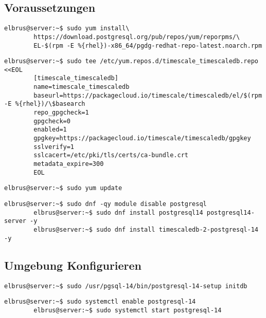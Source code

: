 \documentclass{article}
\begin{document}
	\subsection[dependencies]{Voraussetzungen}
	\lstset{style=commands}
	\begin{lstlisting}[caption={Hinzufügen des PostgreSQL Drittanbieter-Repository, um die neuesten PostgreSQL-Pakete zu erhalten.}]
		elbrus@server:~$ sudo yum install\
		https://download.postgresql.org/pub/repos/yum/reporpms/\
		EL-$(rpm -E %{rhel})-x86_64/pgdg-redhat-repo-latest.noarch.rpm
	\end{lstlisting}

	\lstset{style=commands}
	\begin{lstlisting}[caption={Erstellen des Timescale repository.}]
		elbrus@server:~$ sudo tee /etc/yum.repos.d/timescale_timescaledb.repo <<EOL
		[timescale_timescaledb]
		name=timescale_timescaledb
		baseurl=https://packagecloud.io/timescale/timescaledb/el/$(rpm -E %{rhel})/\$basearch
		repo_gpgcheck=1
		gpgcheck=0
		enabled=1
		gpgkey=https://packagecloud.io/timescale/timescaledb/gpgkey
		sslverify=1
		sslcacert=/etc/pki/tls/certs/ca-bundle.crt
		metadata_expire=300
		EOL
	\end{lstlisting}

	\lstset{style=commands}
	\begin{lstlisting}[caption={Updaten der lokalen Package-Liste.}]
		elbrus@server:~$ sudo yum update
	\end{lstlisting}

	\begin{lstlisting}[caption={Installieren von TimescaleDB.}]
		elbrus@server:~$ sudo dnf -qy module disable postgresql
		elbrus@server:~$ sudo dnf install postgresql14 postgresql14-server -y
		elbrus@server:~$ sudo dnf install timescaledb-2-postgresql-14 -y
	\end{lstlisting}
	
	\newpage
	\subsection[TimescaleDB konfigurieren]{Umgebung Konfigurieren}
	\begin{lstlisting}[caption={Initialisieren der Datenbank.}]
		elbrus@server:~$ sudo /usr/pgsql-14/bin/postgresql-14-setup initdb
	\end{lstlisting}
	
	\begin{lstlisting}[caption={Verknüpfen von 'postgresql' Serive Start mit Serverstart sowie den Service starten.}]
		elbrus@server:~$ sudo systemctl enable postgresql-14
		elbrus@server:~$ sudo systemctl start postgresql-14
	\end{lstlisting}
\end{document}
